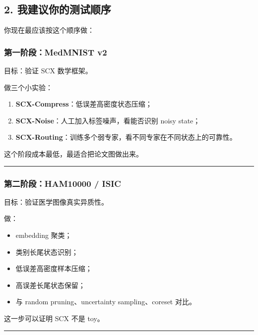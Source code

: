 \documentclass[
  12pt,
]{ctexart}
\providecommand{\tightlist}{%
  \setlength{\itemsep}{0pt}\setlength{\parskip}{0pt}}
\begin{document}
\subsection{2.
我建议你的测试顺序}\label{ux6211ux5efaux8baeux4f60ux7684ux6d4bux8bd5ux987aux5e8f}

你现在最应该按这个顺序做：

\subsubsection{第一阶段：MedMNIST
v2}\label{ux7b2cux4e00ux9636ux6bb5medmnist-v2}

目标：验证 SCX 数学框架。

做三个小实验：

\begin{enumerate}
\def\labelenumi{\arabic{enumi}.}
\tightlist
\item
  \textbf{SCX-Compress}：低误差高密度状态压缩；
\item
  \textbf{SCX-Noise}：人工加入标签噪声，看能否识别 noisy state；
\item
  \textbf{SCX-Routing}：训练多个弱专家，看不同专家在不同状态上的可靠性。
\end{enumerate}

这个阶段成本最低，最适合把论文图做出来。

\begin{center}\rule{0.5\linewidth}{0.5pt}\end{center}

\subsubsection{第二阶段：HAM10000 /
ISIC}\label{ux7b2cux4e8cux9636ux6bb5ham10000-isic}

目标：验证医学图像真实异质性。

做：

\begin{itemize}
\tightlist
\item
  embedding 聚类；
\item
  类别长尾状态识别；
\item
  低误差高密度样本压缩；
\item
  高误差长尾状态保留；
\item
  与 random pruning、uncertainty sampling、coreset 对比。
\end{itemize}

这一步可以证明 SCX 不是 toy。

\begin{center}\rule{0.5\linewidth}{0.5pt}\end{center}
\end{document}
